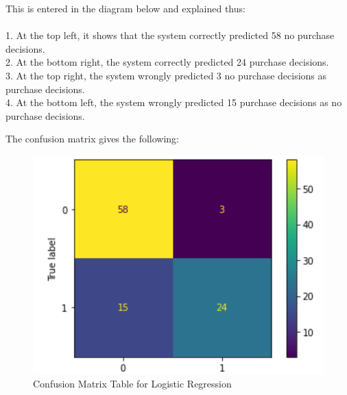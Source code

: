 \documentclass[conference]{IEEEtran}
\begin{document}
This is entered in the diagram below and explained thus:\\
\\
1.	At the top left, it shows that the system correctly predicted 58 no purchase decisions.\\
2.	At the bottom right, the system correctly predicted 24 purchase decisions.\\
3.	At the top right, the system wrongly predicted 3 no purchase decisions as purchase decisions.\\
4.	At the bottom left, the system wrongly predicted 15 purchase decisions as no purchase decisions.

The confusion matrix gives the following:\\
\begin{figure}[h]
    \centering
    \includegraphics[scale=0.47]{figs/PredictL.png}
    \caption{Confusion Matrix Table for Logistic Regression}
    \label{dabc}        
\end{figure}


\end{document}
